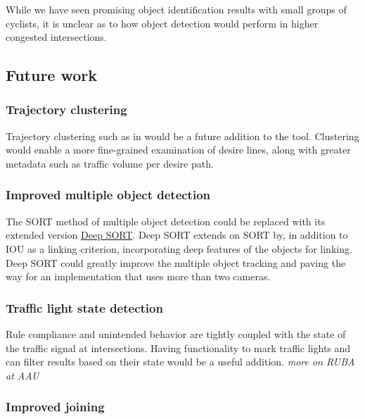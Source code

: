 While we have seen promising object identification results with small groups
of cyclists, it is unclear as to how object detection would perform in higher congested intersections. 
\ \\

\subsection{Future work}
\subsubsection{Trajectory clustering}
Trajectory clustering such as in \cite{gariel_trajectory_2011} would be a future addition to the tool.
Clustering would enable a more fine-grained examination of desire lines,
along with greater metadata such as traffic volume per desire path.
\ \\

\subsubsection{Improved multiple object detection}
The SORT method of multiple object detection could be replaced with its extended version \href{https://github.com/nwojke/deep_sort}{Deep SORT}.
Deep SORT extends on SORT by, in addition to IOU as a linking criterion, incorporating
deep features of the objects for linking. Deep SORT could greatly improve the multiple object tracking
and paving the way for an implementation that uses more than two cameras.
\ \\

\subsubsection{Traffic light state detection}
Rule compliance and unintended behavior are tightly coupled with the state of the traffic signal at intersections. 
Having functionality to mark traffic lights and can filter results based on their state would
be a useful addition. \textit{more on RUBA at AAU}
\ \\

\subsubsection{Improved joining}